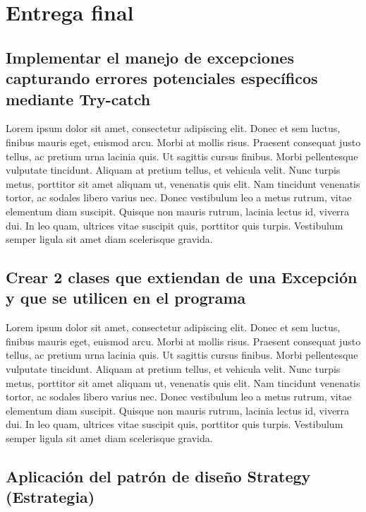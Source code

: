 \renewcommand\thesection{\Alph{section}}
\renewcommand\thesubsection{\thesection.\arabic{subsection}}
\setcounter{section}{5}
\section{Entrega final}

\setcounter{subsection}{1}
\subsection{Implementar el manejo de excepciones capturando errores potenciales específicos mediante Try-catch}

Lorem ipsum dolor sit amet, consectetur adipiscing elit. Donec et sem luctus, finibus mauris eget, euismod arcu. Morbi at mollis risus. Praesent consequat justo tellus, ac pretium urna lacinia quis. Ut sagittis cursus finibus. Morbi pellentesque vulputate tincidunt. Aliquam at pretium tellus, et vehicula velit. Nunc turpis metus, porttitor sit amet aliquam ut, venenatis quis elit. Nam tincidunt venenatis tortor, ac sodales libero varius nec. Donec vestibulum leo a metus rutrum, vitae elementum diam suscipit. Quisque non mauris rutrum, lacinia lectus id, viverra dui. In leo quam, ultrices vitae suscipit quis, porttitor quis turpis. Vestibulum semper ligula sit amet diam scelerisque gravida.

\subsection{Crear 2 clases que extiendan de una Excepción y que se utilicen en el programa}

Lorem ipsum dolor sit amet, consectetur adipiscing elit. Donec et sem luctus, finibus mauris eget, euismod arcu. Morbi at mollis risus. Praesent consequat justo tellus, ac pretium urna lacinia quis. Ut sagittis cursus finibus. Morbi pellentesque vulputate tincidunt. Aliquam at pretium tellus, et vehicula velit. Nunc turpis metus, porttitor sit amet aliquam ut, venenatis quis elit. Nam tincidunt venenatis tortor, ac sodales libero varius nec. Donec vestibulum leo a metus rutrum, vitae elementum diam suscipit. Quisque non mauris rutrum, lacinia lectus id, viverra dui. In leo quam, ultrices vitae suscipit quis, porttitor quis turpis. Vestibulum semper ligula sit amet diam scelerisque gravida.

\subsection{Aplicación del patrón de diseño Strategy (Estrategia)}


